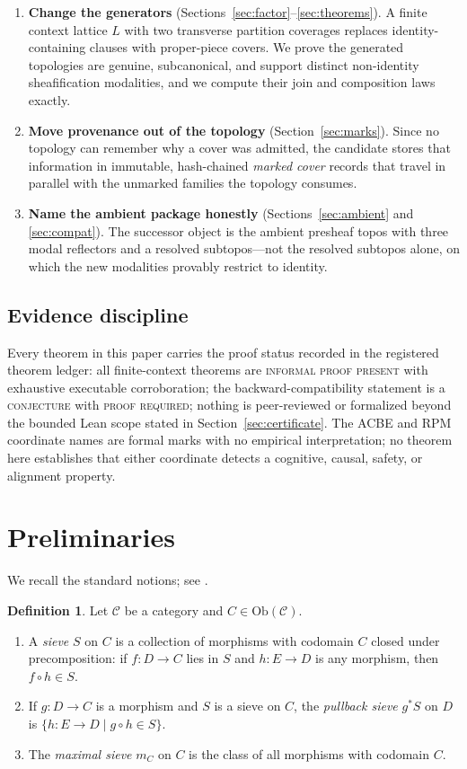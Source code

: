 \documentclass[11pt]{amsart}
\theoremstyle{definition}
\newtheorem{definition}[theorem]{Definition}
\theoremstyle{remark}
\newcommand{\Ob}{\mathrm{Ob}}
\newcommand{\cC}{\mathcal{C}}
\begin{document}
\begin{enumerate}
\item \textbf{Change the generators} (Sections~\ref{sec:factor}--\ref{sec:theorems}). A finite context lattice $L$ with two transverse partition coverages replaces identity-containing clauses with proper-piece covers. We prove the generated topologies are genuine, subcanonical, and support distinct non-identity sheafification modalities, and we compute their join and composition laws exactly.
\item \textbf{Move provenance out of the topology} (Section~\ref{sec:marks}). Since no topology can remember why a cover was admitted, the candidate stores that information in immutable, hash-chained \emph{marked cover} records that travel in parallel with the unmarked families the topology consumes.
\item \textbf{Name the ambient package honestly} (Sections~\ref{sec:ambient} and \ref{sec:compat}). The successor object is the ambient presheaf topos with three modal reflectors and a resolved subtopos---not the resolved subtopos alone, on which the new modalities provably restrict to identity.
\end{enumerate}

\subsection{Evidence discipline}
Every theorem in this paper carries the proof status recorded in the registered theorem ledger: all finite-context theorems are \textsc{informal proof present} with exhaustive executable corroboration; the backward-compatibility statement is a \textsc{conjecture} with \textsc{proof required}; nothing is peer-reviewed or formalized beyond the bounded Lean scope stated in Section~\ref{sec:certificate}. The ACBE and RPM coordinate names are formal marks with no empirical interpretation; no theorem here establishes that either coordinate detects a cognitive, causal, safety, or alignment property.

\section{Preliminaries}\label{sec:prelim}

We recall the standard notions; see \cite{maclane,stacks00ZC}.

\begin{definition}\label{def:sieve}
Let $\cC$ be a category and $C\in\Ob(\cC)$.
\begin{enumerate}
\item A \emph{sieve} $S$ on $C$ is a collection of morphisms with codomain $C$ closed under precomposition: if $f:D\to C$ lies in $S$ and $h:E\to D$ is any morphism, then $f\circ h\in S$.
\item If $g:D\to C$ is a morphism and $S$ is a sieve on $C$, the \emph{pullback sieve} $g^{*}S$ on $D$ is $\{h:E\to D \mid g\circ h\in S\}$.
\item The \emph{maximal sieve} $m_C$ on $C$ is the class of all morphisms with codomain $C$.
\end{enumerate}
\end{definition}
\end{document}
